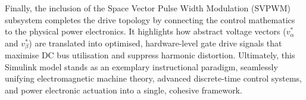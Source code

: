 \documentclass[12pt]{article}
\begin{document}
Finally, the inclusion of the Space Vector Pulse Width Modulation (SVPWM) subsystem completes the drive topology by connecting the control mathematics to the physical power electronics. It highlights how abstract voltage vectors ($v_\alpha^*$ and $v_\beta^*$) are translated into optimised, hardware-level gate drive signals that maximise DC bus utilisation and suppress harmonic distortion. Ultimately, this Simulink model stands as an exemplary instructional paradigm, seamlessly unifying electromagnetic machine theory, advanced discrete-time control systems, and power electronic actuation into a single, cohesive framework.
\end{document}
